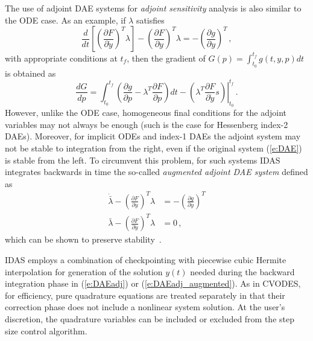 The use of adjoint DAE systems for {\em adjoint sensitivity} analysis is also
similar to the ODE case. As an example, if $\lambda$ satisfies 
\begin{equation}\label{e:DAEadj} 
  \frac{d}{dt} \left[ \left( \frac{\partial F}{\partial \dot{y}}\right) ^T \lambda \right] 
  - \left(\frac{\partial F}{\partial y}\right)^T \lambda 
  = - \left( \frac{\partial g}{\partial y}\right)^T \, ,
\end{equation}
with appropriate conditions at $t_f$, then the gradient of 
$G(p) = \int_{t_0}^{t_f} g(t,y,p) dt$ is obtained as
\begin{equation*}
  \frac{dG}{dp} = 
  \int_{t_0}^{t_f} \left(
    \frac{\partial g}{\partial p} - \lambda^T \frac{\partial F}{\partial p}
  \right) dt 
  - \left.\left( 
      \lambda^T \frac{\partial F}{\partial \dot{y}} s 
    \right)\right|_{t_0}^{t_f} \, . 
\end{equation*}
However, unlike the ODE case, homogeneous final conditions for the 
adjoint variables may not always be enough (such is the case for 
Hessenberg index-2 DAEs).
%
Moreover, for implicit ODEs and index-1 DAEs the adjoint system may not
be stable to integration from the right, even if the original system (\ref{e:DAE}) 
is stable from the left. To circumvent this problem, for such
systems IDAS integrates backwards in time the so-called 
{\em augmented adjoint DAE system} defined as
\begin{equation} \label{e:DAEadj_augmented}
\begin{split}
  \dot {\bar\lambda} -  \left(\frac{\partial F}{\partial y}\right)^T \lambda 
  &  = - \left( \frac{\partial g}{\partial y}\right)^T \\
  \bar \lambda - \left( \frac{\partial F}{\partial \dot{y}}\right) ^T \lambda 
  & = 0 \, ,
\end{split}
\end{equation}
which can be shown to preserve stability~\cite{CLPS:03}.

IDAS employs a combination of checkpointing with piecewise cubic Hermite 
interpolation for generation of the solution $y(t)$ needed during the
backward integration phase in (\ref{e:DAEadj}) or (\ref{e:DAEadj_augmented}).
As in CVODES, for efficiency, pure quadrature equations are treated separately
in that their correction phase does not include a nonlinear system solution.
At the user's discretion, the quadrature variables can be included or excluded
from the step size control algorithm.
 

